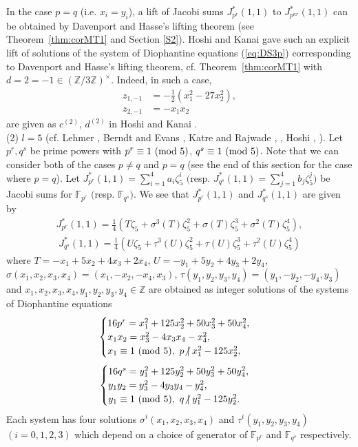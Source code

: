\documentclass[a4paper, 11pt]{amsart}
\newcommand{\notmid}{\mathrel{\ooalign{$\mkern-5mu\not$\crcr$|$}}}
\newcommand{\Z}{\mathbb Z}
\newcommand{\F}{\mathbb F}
\theoremstyle{plain}
\theoremstyle{definition}
\numberwithin{equation}{section}
\begin{document}
In the case
$p=q$ (i.e. $x_i=y_i$), 
a lift of Jacobi sums $J^\ast_{p^r}(1,1)$ to $J^\ast_{p^{nr}}(1,1)$ 
can be obtained by Davenport and Hasse's lifting theorem 
(see Theorem~\ref{thm:corMT1} and Section \ref{S2}). 
Hoshi and Kanai \cite[Section 7, (1) $e=3$]{HK22} 
gave such an explicit lift of solutions of the system of Diophantine equations (\ref{eq:DS3p}) corresponding to Davenport and Hasse's lifting theorem, cf. Theorem~\ref{thm:corMT1} with 
$d=2=-1 \in(\Z/3\Z)^{\times}$. 
Indeed, in such a case, 
\begin{align*}
z_{1,-1}&=-\frac{1}{2}(x_1^2-27x_2^2),\\
z_{2,-1}&=-x_1x_2
\end{align*}
are given as $c^{(2)}$, $d^{(2)}$ in Hoshi and Kanai \cite[page 19, line 8]{HK22}.\\

(2) $l=5$ (cf. Lehmer \cite[Equation (10)]{Leh51}, Berndt and Evans \cite[Section 5]{BE81},  Katre and Rajwade \cite{KR85b}, \cite[Section 3.7]{BEW98}, Hoshi \cite[Section 5]{Hos03}, \cite[Section 3]{Hos06}).
Let $p^r, q^s$ be prime powers with $p^r\equiv 1\ ({\rm mod}\ 5)$, $q^s\equiv 1\ ({\rm mod}\ 5)$. 
Note that we can consider both of the cases $p\neq q$ 
and $p=q$ (see the end of this section for the case where $p=q$). 
Let 
$J^\ast_{p^r}(1,1)=\sum_{i=1}^{4}a_{i}\zeta_5^{i}$ $($resp. $J^\ast_{q^s}(1,1)=\sum_{j=1}^{4}b_{j}\zeta_5^{j}$$)$ 
be 
Jacobi sums for $\F_{p^r}$ $($resp. $\F_{q^s}$$)$. 
We see that $J^\ast_{p^r}(1,1)$ and $J^\ast_{q^s}(1,1)$ are given by 
\begin{align*}
J^\ast_{p^r}(1,1)
=\frac{1}{4}\left(T\zeta_5+\sigma^3(T)\zeta_5^2+\sigma(T)\zeta_5^3+\sigma^2(T)\zeta_5^4\right),
\end{align*}
\begin{align*}
J^\ast_{q^s}(1,1)
=\frac{1}{4}\left(U\zeta_5+\tau^3(U)\zeta_5^2+\tau(U)\zeta_5^3+\tau^2(U)\zeta_5^4\right)
\end{align*}
where $T=-x_1+5x_2+4x_3+2x_4$, $U=-y_1+5y_2+4y_3+2y_4$, $\sigma(x_1,x_2,x_3,x_4)=(x_1,-x_2,-x_4,x_3)$, $\tau(y_1,y_2,y_3,y_4)=(y_1,-y_2,-y_4,y_3)$ and
$x_1,x_2,x_3,x_4, y_1,y_2,y_3,y_4\in\Z$ are obtained as 
integer solutions of the systems of Diophantine equations 
\begin{align}\label{eq:DS5p}
\begin{cases}
16p^r=x_1^2+125x_2^2+50x_3^2+50x_4^2,\\
x_1x_2=x_3^2-4x_3x_4-x_4^2, \\
x_1 \equiv 1\ ({\rm mod}\ 5),\ p\notmid x_1^2-125x_2^2,
\end{cases} %
\end{align}
\begin{align*} %
\begin{cases}
16q^s=y_1^2+125y_2^2+50y_3^2+50y_4^2,\\
y_1y_2=y_3^2-4y_3y_4-y_4^2, \\
y_1 \equiv 1\ ({\rm mod}\ 5),\ q\notmid y_1^2-125y_2^2.
\end{cases} %
\end{align*}
Each system has four solutions $\sigma^i(x_1,x_2,x_3,x_4)$ and $\tau^i(y_1,y_2,y_3,y_4)$ $(i=0,1,2,3)$ 
which depend on a choice of generator of $\F_{p^r}$ and $\F_{q^s}$ 
respectively.
\end{document}
